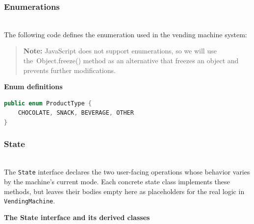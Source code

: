 \subsubsection{Enumerations}\label{VyVrBLUQl6c8XvpAPCVIt}
\\
The following code defines the enumeration used in the vending machine system:
\begin{quote}
\textbf{Note:} JavaScript does not support enumerations, so we will use the\ Object.freeze() method as an alternative that freezes an object and prevents further modifications.
\end{quote}

\textbf{Enum definitions}

\begin{lstlisting}[language=Java]
public enum ProductType {
    CHOCOLATE, SNACK, BEVERAGE, OTHER
}
\end{lstlisting}

\subsubsection{State}\label{d6DcwCJ0jKUAiX5iUpOvw-2}
\\
The \texttt{State} interface declares the two user-facing operations whose behavior varies by the machine's current mode. Each concrete state class implements these methods, but leaves their bodies empty here as placeholders for the real logic in \texttt{VendingMachine}.

\textbf{The State interface and its derived classes}

